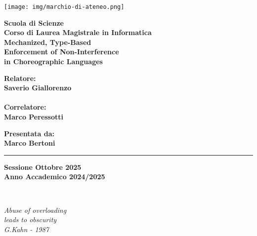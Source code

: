 \documentclass[12pt,a4paper,twoside]{book}
\begin{document}
\pagestyle{empty}

\begin{titlepage}
\begin{center}

\texttt{[image: img/marchio-di-ateneo.png]}

\vspace{10mm}
{\large{\bf{Scuola di Scienze}}}\\
\vspace{5mm}
{\Large{\bf{Corso di Laurea Magistrale in Informatica}}}\\
\vspace{15mm}
{\Huge{\bf Mechanized, Type-Based}}\\
\vspace{1mm}
{\Huge{\bf Enforcement of Non-Interference}}\\
\vspace{2mm}
{\Huge{\bf in Choreographic Languages}}\\
\end{center}
\vspace{35mm}
\begin{minipage}[t]{0.40\textwidth}
{\Large{\bf Relatore: \\ Saverio Giallorenzo}}\\
\vspace{3mm}\\
{\Large{\bf Correlatore: \\ Marco Peressotti}}
\end{minipage}
\hfill
\begin{minipage}[t]{0.40\textwidth}\raggedleft
{\Large{\bf Presentata da: \\ Marco Bertoni}}
\end{minipage}

\vspace{35mm}
\rule[0.5cm]{15.8cm}{0.6mm}
\begin{center}
{\large{\bf Sessione Ottobre 2025\\}}
{\large{\bf Anno Accademico 2024/2025\\}}
\end{center}
\end{titlepage}
\restoregeometry

\newpage~\newpage

\topmargin=6.5cm
\begin{flushright}
\emph{
\LARGE{Abuse of overloading}\\\vspace{1mm}
\LARGE{leads to obscurity}\\\vspace{3mm} 
\LARGE{G.Kahn - 1987} 
}
\end{flushright}
\end{document}
